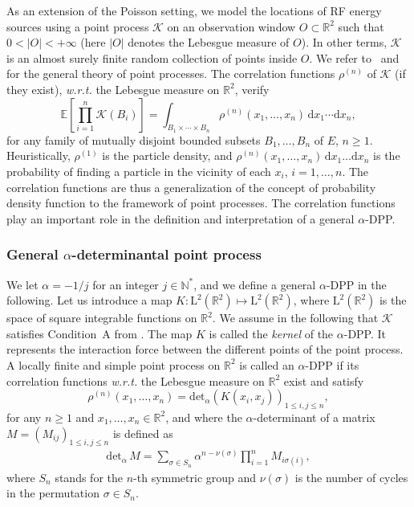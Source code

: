 \documentclass[12pt,draftclsnofoot,onecolumn]{IEEEtran}
\begin{document}
As an extension of the Poisson setting, we model the locations of RF energy sources using a point process $\mathcal{K}$ on an observation window $O\subset\mathbb R^2$ such that $0<|O|<+\infty$ (here $|O|$ denotes the Lebesgue measure of $O$). In other terms, $\mathcal{K}$ is an almost surely finite random collection of points inside $O$. We refer to~\cite{Kallenberg} and~\cite{DaleyVereJones} for the general theory of point processes. The correlation functions $\rho^{(n)}$ of $\mathcal K$ (if they exist), {\em w.r.t.} the Lebesgue measure on $\mathbb R^2$,  verify
\begin{equation}
\label{eq:defcorrelation}
\mathbb E\left[\prod_{i=1}^{n}\mathcal K(B_i)\right]=\int_{B_1\times\cdots\times
B_n}\rho^{(n)}(x_1,\ldots,x_n)\,\mathrm{d}x_1 \cdots	\mathrm{d}x_n,
\end{equation}
for any family of mutually disjoint bounded subsets $B_1,\ldots,B_n$ of $E$, $n\geq 1$. 
Heuristically, $\rho^{(1)}$ is the particle density, and 
$\rho^{(n)}(x_1,\ldots,x_n)\,\mathrm dx_1\ldots\mathrm dx_n$
is the probability of finding a particle in the vicinity of each $x_i$, $i=1,\dots,n$. The correlation functions are thus a generalization of the concept of probability density function to the framework of point processes. The correlation functions play an important role in the definition and interpretation of a general $\alpha$-DPP.

\subsubsection{General $\alpha$-determinantal point process}

We let $\alpha=-1/j$ for an integer $j\in\mathbb{N}^*$, and we define a general $\alpha$-DPP in the following. Let us introduce a map $K:\mathrm L^2(\mathbb R^2)\mapsto\mathrm L^2(\mathbb R^2)$, where $\mathrm L^2(\mathbb R^2)$ is the space of square integrable functions on $\mathbb R^2$. We assume in the following that $\mathcal K$ satisfies Condition~A from \cite{ShiraiTakahashi}.
The map $K$ is called the {\em kernel} of the $\alpha$-DPP. It represents the interaction force between the different points of the point process. 
A locally
finite and simple point process on $\mathbb R^2$ is called an $\alpha$-DPP if its
correlation functions {\em w.r.t.} the Lebesgue measure on $\mathbb R^2$ exist and
satisfy
\begin{equation}
\label{eq:correlationfunctions}
\rho^{(n)}(x_1,\ldots,x_n)=\mathrm{det}_\alpha(K(x_i,x_j))_{1\leq i,j\leq n},
\end{equation}
for any $n\geq 1$ and $x_1,\ldots,x_n\in\mathbb R^2$, and where the $\alpha$-determinant of a matrix $M=(M_{ij})_{1\le i,j\le n}$ is defined as
\begin{eqnarray}
\mathrm{det}_\alpha\,M = \sum_{\sigma\in S_n} \alpha^{n - \nu(\sigma)} \prod_{i=1}^n M_{i \sigma(i)},
\end{eqnarray}
where $S_n$ stands for the $n$-th symmetric group and $\nu(\sigma)$ is the number of cycles in the permutation $\sigma \in S_n$. 
\end{document}
